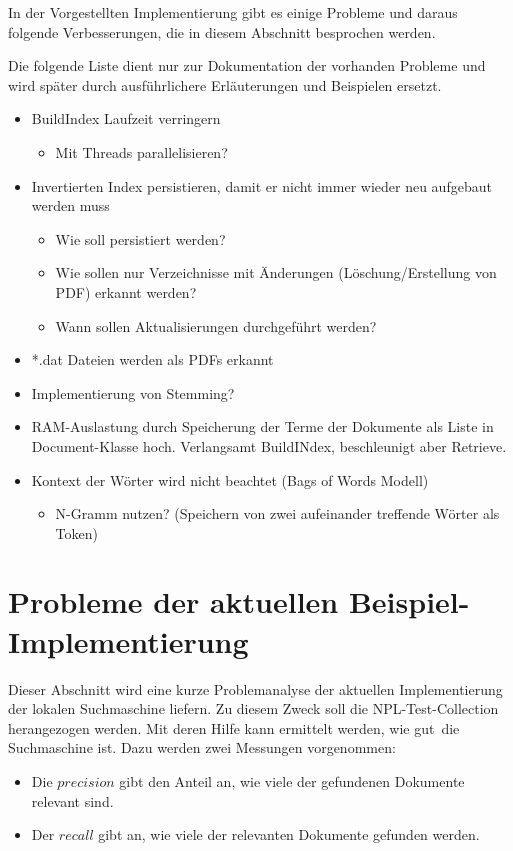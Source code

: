 In der Vorgestellten Implementierung gibt es einige Probleme und daraus folgende Verbesserungen, die in diesem Abschnitt besprochen werden.

Die folgende Liste dient nur zur Dokumentation der vorhanden Probleme und wird später durch ausführlichere Erläuterungen und Beispielen ersetzt.
\begin{itemize}
	\item BuildIndex Laufzeit verringern
	\begin{itemize}
		\item Mit Threads parallelisieren?
	\end{itemize}
	\item Invertierten Index persistieren, damit er nicht immer wieder neu aufgebaut werden muss
	\begin{itemize}
		\item Wie soll persistiert werden?
		\item Wie sollen nur Verzeichnisse mit Änderungen (Löschung/Erstellung von PDF) erkannt werden?
		\item Wann sollen Aktualisierungen durchgeführt werden?
	\end{itemize}
	\item *.dat Dateien werden als PDFs erkannt
	\item Implementierung von Stemming?
	\item RAM-Auslastung durch Speicherung der Terme der Dokumente als Liste in Document-Klasse hoch. Verlangsamt BuildINdex, beschleunigt aber Retrieve.
	\item Kontext der Wörter wird nicht beachtet (Bags of Words Modell)
	\begin{itemize}
		\item N-Gramm nutzen? (Speichern von zwei aufeinander treffende Wörter als Token)
	\end{itemize}
\end{itemize}

\section{Probleme der aktuellen Beispiel-Implementierung}
Dieser Abschnitt wird eine kurze Problemanalyse der aktuellen Implementierung der lokalen Suchmaschine liefern. Zu diesem Zweck soll die NPL-Test-Collection herangezogen werden. Mit deren Hilfe kann ermittelt werden, wie \glqq gut\grqq\ die Suchmaschine ist. Dazu werden zwei Messungen vorgenommen:
\begin{itemize}
	\item Die $precision$ gibt den Anteil an, wie viele der gefundenen Dokumente relevant sind.
	\item Der $recall$ gibt an, wie viele der relevanten Dokumente gefunden werden.
\end{itemize}

